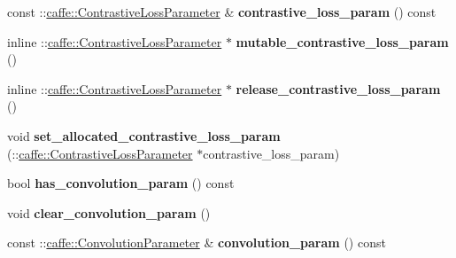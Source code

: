 \begin{DoxyCompactItemize}
\item 
\mbox{\label{classcaffe_1_1_layer_parameter_a68530255109513f6a7625abf740cb4cf}} 
const \+::\mbox{\hyperlink{classcaffe_1_1_contrastive_loss_parameter}{caffe\+::\+Contrastive\+Loss\+Parameter}} \& {\bfseries contrastive\+\_\+loss\+\_\+param} () const
\item 
\mbox{\label{classcaffe_1_1_layer_parameter_a1370650c1ad2c8fc9f101a849c6036f2}} 
inline \+::\mbox{\hyperlink{classcaffe_1_1_contrastive_loss_parameter}{caffe\+::\+Contrastive\+Loss\+Parameter}} $\ast$ {\bfseries mutable\+\_\+contrastive\+\_\+loss\+\_\+param} ()
\item 
\mbox{\label{classcaffe_1_1_layer_parameter_a031ed92b672f7e2afe19a990db81269f}} 
inline \+::\mbox{\hyperlink{classcaffe_1_1_contrastive_loss_parameter}{caffe\+::\+Contrastive\+Loss\+Parameter}} $\ast$ {\bfseries release\+\_\+contrastive\+\_\+loss\+\_\+param} ()
\item 
\mbox{\label{classcaffe_1_1_layer_parameter_aa0c1b6177cee4f948a017b3299b91540}} 
void {\bfseries set\+\_\+allocated\+\_\+contrastive\+\_\+loss\+\_\+param} (\+::\mbox{\hyperlink{classcaffe_1_1_contrastive_loss_parameter}{caffe\+::\+Contrastive\+Loss\+Parameter}} $\ast$contrastive\+\_\+loss\+\_\+param)
\item 
\mbox{\label{classcaffe_1_1_layer_parameter_a9625833bee86b982a2ac2d22edf2dc8f}} 
bool {\bfseries has\+\_\+convolution\+\_\+param} () const
\item 
\mbox{\label{classcaffe_1_1_layer_parameter_a2741c6e333854ef356f057fe41712c44}} 
void {\bfseries clear\+\_\+convolution\+\_\+param} ()
\item 
\mbox{\label{classcaffe_1_1_layer_parameter_abdee4da678c00db08def3e884ee09a2b}} 
const \+::\mbox{\hyperlink{classcaffe_1_1_convolution_parameter}{caffe\+::\+Convolution\+Parameter}} \& {\bfseries convolution\+\_\+param} () const
\item 
\mbox{\label{classcaffe_1_1_layer_parameter_a19b977378e7a4097d026178c74dddc47}} 

\end{DoxyCompactItemize}
